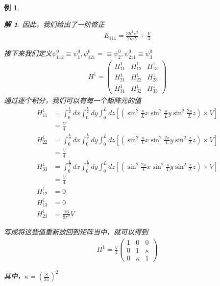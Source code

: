 \documentclass{article}
\newtheorem{example}{例}
\newtheorem{solution}{解}
\begin{document}
\begin{example}
\begin{solution}
    因此，我们给出了一阶修正
    \begin{align*}
        E_{111}=\frac{3\hbar^2\pi^2}{2mL}+\frac{V}{4}
    \end{align*}

    接下来我们定义$\psi_{112}^0\equiv\psi_1^0,\psi_{121}^0=\equiv\psi_2^0,\psi_{211}^0\equiv\psi_3^0$
    \begin{align*}
        H^1=
        \begin{pmatrix}
            H_{11}^1&H_{12}^1&H_{13}^1\\
            H_{21}^1&H_{22}^1&H_{23}^1\\
            H_{31}^1&H_{32}^1&H_{33}^1    
        \end{pmatrix}
    \end{align*}
    通过逐个积分，我们可以有每一个矩阵元的值
    \begin{align*}
        H_{11}^1&=\int_{0}^{\frac{L}{2}} dx\int_{0}^{\frac{L}{2}} dy\int_{0}^{L} dz \left[\left(\sin^2{\frac{\pi}{L}x}\sin^2{\frac{\pi}{L}y}\sin^2{\frac{2\pi}{L}z}\right)\times V\right]\\
        &=\frac{V}{4}\\
        H_{22}^1&=\int_{0}^{\frac{L}{2}} dx\int_{0}^{\frac{L}{2}} dy\int_{0}^{L} dz \left[\left(\sin^2{\frac{\pi}{L}x}\sin^2{\frac{2\pi}{L}y}\sin^2{\frac{\pi}{L}z}\right)\times V\right]\\
        &=\frac{V}{4}\\
        H_{33}^1&=\int_{0}^{\frac{L}{2}} dx\int_{0}^{\frac{L}{2}} dy\int_{0}^{L} dz \left[\left(\sin^2{\frac{2\pi}{L}x}\sin^2{\frac{\pi}{L}y}\sin^2{\frac{\pi}{L}z}\right)\times V\right]\\
        &=\frac{V}{4}\\
        H_{12}^1&=0\\
        H_{13}^1&=0\\
        H_{23}^1&=\frac{16}{9\pi^2}V
    \end{align*}
    
    写成将这些值重新放回到矩阵当中，就可以得到
    \begin{align*}
        H^1=\frac{V}{4}
        \begin{pmatrix}
            1&0&0\\
            0&1&\kappa\\
            0&\kappa&1
        \end{pmatrix}
    \end{align*}
    
    其中，$\displaystyle\kappa=\left(\frac{8}{3\pi}\right)^2$


\end{solution}
\end{example}
\end{document}
